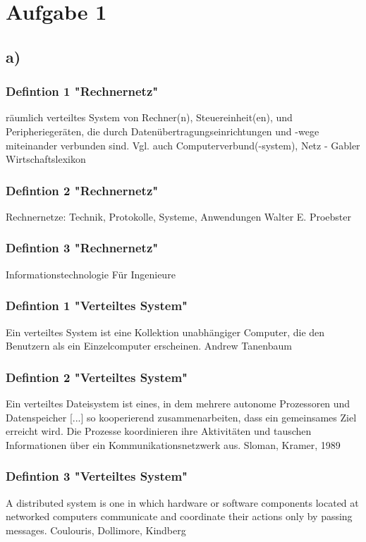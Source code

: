 \documentclass[a4paper,12pt]{scrartcl}
\begin{document}
\section{Aufgabe 1}
\subsection{a)}
\subsubsection{Defintion 1 "Rechnernetz"}

räumlich verteiltes System von Rechner(n), Steuereinheit(en), und Peripheriegeräten, die durch Datenübertragungseinrichtungen und -wege miteinander verbunden sind. Vgl. auch Computerverbund(-system), Netz
- Gabler Wirtschaftslexikon

\subsubsection{Defintion 2 "Rechnernetz"}
Rechnernetze: Technik, Protokolle, Systeme, Anwendungen Walter E. Proebster

\subsubsection{Defintion 3 "Rechnernetz"}
Informationstechnologie Für Ingenieure

\subsubsection{Defintion 1 "Verteiltes System"}
Ein verteiltes System ist eine Kollektion unabhängiger Computer, die den Benutzern als ein Einzelcomputer erscheinen. Andrew Tanenbaum

\subsubsection{Defintion 2 "Verteiltes System"}
Ein verteiltes Dateisystem ist eines, in dem mehrere autonome Prozessoren
und Datenspeicher [...] so kooperierend zusammenarbeiten, dass ein gemeinsames 
Ziel erreicht wird. Die Prozesse koordinieren ihre
Aktivitäten und tauschen Informationen über ein Kommunikationsnetzwerk aus.
Sloman, Kramer, 1989

\subsubsection{Defintion 3 "Verteiltes System"}
A distributed system is one in which hardware or software components located at networked computers
communicate and coordinate their actions only by passing messages.
Coulouris, Dollimore, Kindberg
\end{document}
